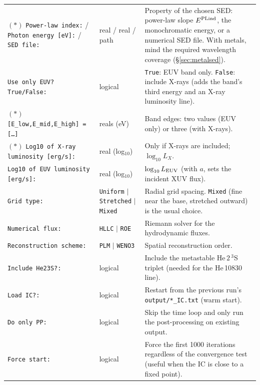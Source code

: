\documentclass[english,a4paper]{kiseon_memo}
\begin{document}
\begin{longtable}{@{}p{}p{}p{}@{}}
$(\ast)$ \texttt{Power-law index:} / \texttt{Photon energy [eV]:} /
  \texttt{SED file:} & real / real / path & Property of the chosen SED:
  power-law slope $E^{\rm PLind}$, the monochromatic energy, or a numerical SED
  file. With metals, mind the required wavelength coverage
  (\S\ref{sec:metalsed}). \\
\texttt{Use only EUV? True/False:} & logical & \texttt{True}: EUV band only.
  \texttt{False}: include X-rays (adds the band's third energy and an X-ray
  luminosity line). \\
$(\ast)$ \texttt{[E\_low,E\_mid,E\_high] = [\ldots]} & reals (eV) & Band edges:
  two values (EUV only) or three (with X-rays). \\
$(\ast)$ \texttt{Log10 of X-ray luminosity [erg/s]:} & real (log$_{10}$) & Only
  if X-rays are included; $\log_{10}L_X$. \\
\texttt{Log10 of EUV luminosity [erg/s]:} & real (log$_{10}$) & $\log_{10}L_{\rm
  EUV}$ (with $a$, sets the incident XUV flux). \\
\texttt{Grid type:} & \texttt{Uniform} $|$ \texttt{Stretched} $|$ \texttt{Mixed}
  & Radial grid spacing. \texttt{Mixed} (fine near the base, stretched outward)
  is the usual choice. \\
\texttt{Numerical flux:} & \texttt{HLLC} $|$ \texttt{ROE} & Riemann solver for
  the hydrodynamic fluxes. \\
\texttt{Reconstruction scheme:} & \texttt{PLM} $|$ \texttt{WENO3} & Spatial
  reconstruction order. \\
\texttt{Include He23S?:} & logical & Include the metastable He\,$2\,^3$S triplet
  (needed for the He\,10830 line). \\
\texttt{Load IC?:} & logical & Restart from the previous run's
  \texttt{output/*\_IC.txt} (warm start). \\
\texttt{Do only PP:} & logical & Skip the time loop and only run the
  post-processing on existing output. \\
\texttt{Force start:} & logical & Force the first 1000 iterations regardless of
  the convergence test (useful when the IC is close to a fixed point). \\
\end{longtable}
\end{document}
